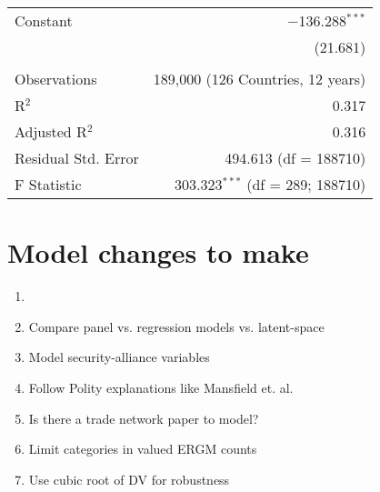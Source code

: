 \documentclass{article}
\begin{document}
\begin{longtable}{lr}
 Constant & $-$136.288$^{***}$ \\ 
  & (21.681) \\ 

\hline \\[-1.8ex] 
Observations & 189,000 (126 Countries, 12 years)\\ 
R$^{2}$ & 0.317 \\ 
Adjusted R$^{2}$ & 0.316 \\ 
Residual Std. Error & 494.613 (df = 188710) \\ 
F Statistic & 303.323$^{***}$ (df = 289; 188710) \\ 
\end{longtable} 

\section{Model changes to make}
\begin{enumerate}
\item 
\item Compare panel vs. regression models vs. latent-space
\item Model security-alliance variables
\item Follow Polity explanations like Mansfield et. al. 
\item Is there a trade network paper to model?
\item Limit categories in valued ERGM counts
\item Use cubic root of DV for robustness
	
\end{enumerate}
\end{document}

